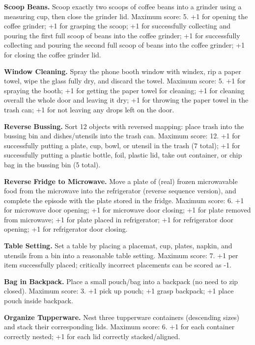 \noindent \textbf{Scoop Beans.} Scoop exactly two scoops of coffee beans into a grinder using a measuring cup, then close the grinder lid. Maximum score: 5. +1 for opening the coffee grinder; +1 for grasping the scoop; +1 for successfully collecting and pouring the first full scoop of beans into the coffee grinder; +1 for successfully collecting and pouring the second full scoop of beans into the coffee grinder; +1 for closing the coffee grinder lid.

\noindent \textbf{Window Cleaning.} Spray the phone booth window with windex, rip a paper towel, wipe the glass fully dry, and discard the towel. Maximum score: 5. +1 for spraying the booth; +1 for getting the paper towel for cleaning; +1 for cleaning overall the whole door and leaving it dry; +1 for throwing the paper towel in the trash can; +1 for not leaving any drops left on the door.

\noindent \textbf{Reverse Bussing.} Sort 12 objects with reversed mapping: place trash into the bussing bin and dishes/utensils into the trash can. Maximum score: 12. +1 for successfully putting a plate, cup, bowl, or utensil in the trash (7 total); +1 for successfully putting a plastic bottle, foil, plastic lid, take out container, or chip bag in the bussing bin (5 total).

\noindent \textbf{Reverse Fridge to Microwave.} Move a plate of (real) frozen microwavable food from the microwave into the refrigerator (reverse sequence version), and complete the episode with the plate stored in the fridge.
Maximum score: 6. +1 for microwave door opening; +1 for microwave door closing; +1 for plate removed from microwave; +1 for plate placed in refrigerator; +1 for refrigerator door opening; +1 for refrigerator door closing.

\noindent \textbf{Table Setting.} Set a table by placing a placemat, cup, plates, napkin, and utensils from a bin into a reasonable table setting.
Maximum score: 7. +1 per item successfully placed; critically incorrect placements can be scored as -1.

\noindent \textbf{Bag in Backpack.} Place a small pouch/bag into a backpack (no need to zip closed).
Maximum score: 3. +1 pick up pouch; +1 grasp backpack; +1 place pouch inside backpack.

\noindent \textbf{Organize Tupperware.} Nest three tupperware containers (descending sizes) and stack their corresponding lids.
Maximum score: 6. +1 for each container correctly nested; +1 for each lid correctly stacked/aligned.

